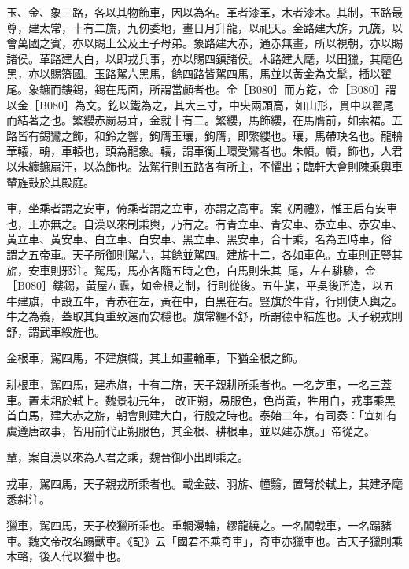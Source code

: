 \begin{pinyinscope}
 玉、金、象三路，各以其物飾車，因以為名。革者漆革，木者漆木。其制，玉路最尊，建太常，十有二旒，九仞委地，畫日月升龍，以祀天。金路建大旂，九旒，以會萬國之賓，亦以賜上公及王子母弟。象路建大赤，通赤無畫，所以視朝，亦以賜諸侯。革路建大白，以即戎兵事，亦以賜四鎮諸侯。木路建大麾，以田獵，其麾色黑，亦以賜籓國。玉路駕六黑馬，餘四路皆駕四馬，馬並以黃金為文髦，插以翟
 尾。象鑣而鏤錫，錫在馬面，所謂當顱者也。金［B080］而方釳，金［B080］謂以金［B080］為文。釳以鐵為之，其大三寸，中央兩頭高，如山形，貫中以翟尾而結著之也。繁纓赤罽易茸，金就十有二。繁纓，馬飾纓，在馬膺前，如索裙。五路皆有錫鸞之飾，和鈴之響，鉤膺玉瓖，鉤膺，即繁纓也。瓖，馬帶玦名也。龍輈華轙，輈，車轅也，頭為龍象。轙，謂車衡上環受鸞者也。朱幩。幩，飾也，人君以朱纏鑣扇汗，以為飾也。法駕行則五路各有所主，不懼出；臨軒大會則陳乘輿車輦旌鼓於其殿庭。



 車，坐乘者謂之安車，倚乘者謂之立車，亦謂之高車。案《周禮》，惟王后有安車也，王亦無之。自漢以來制乘輿，乃有之。有青立車、青安車、赤立車、赤安車、黃立車、黃安車、白立車、白安車、黑立車、黑安車，合十乘，名為五時車，俗
 謂之五帝車。天子所御則駕六，其餘並駕四。建旂十二，各如車色。立車則正豎其旂，安車則邪注。駕馬，馬亦各隨五時之色，白馬則朱其尾，左右騑驂，金［B080］鏤錫，黃屋左纛，如金根之制，行則從後。五牛旗，平吳後所造，以五牛建旗，車設五牛，青赤在左，黃在中，白黑在右。豎旗於牛背，行則使人輿之。牛之為義，蓋取其負重致遠而安穩也。旗常纏不舒，所謂德車結旌也。天子親戎則舒，謂武車綏旌也。



 金根車，駕四馬，不建旗幟，其上如畫輪車，下猶金根之飾。



 耕根車，駕四馬，建赤旗，十有二旒，天子親耕所乘者也。一名芝車，一名三蓋車。置耒耜於軾上。魏景初元年，
 改正朔，易服色，色尚黃，牲用白，戎事乘黑首白馬，建大赤之旂，朝會則建大白，行殷之時也。泰始二年，有司奏：「宜如有虞遵唐故事，皆用前代正朔服色，其金根、耕根車，並以建赤旗。」帝從之。



 輦，案自漢以來為人君之乘，魏晉御小出即乘之。



 戎車，駕四馬，天子親戎所乘者也。載金鼓、羽旂、幢翳，置弩於軾上，其建矛麾悉斜注。



 獵車，駕四馬，天子校獵所乘也。重輞漫輪，繆龍繞之。一名闒戟車，一名蹋豬車。魏文帝改名蹋獸車。《記》云「國君不乘奇車」，奇車亦獵車也。古天子獵則乘木輅，後人代以獵車也。




\end{pinyinscope}
